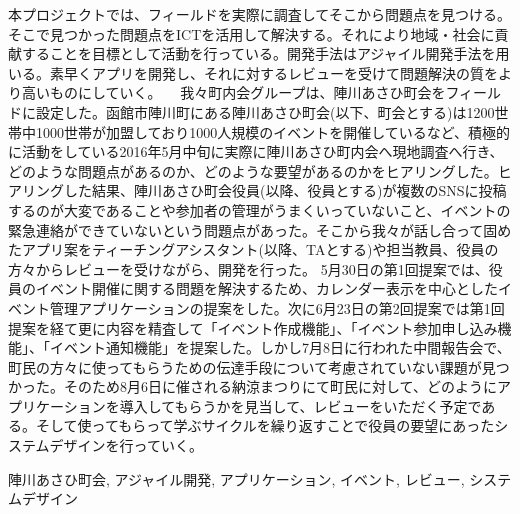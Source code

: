 \begin{jabstract}
本プロジェクトでは、フィールドを実際に調査してそこから問題点を見つける。そこで見つかった問題点をICTを活用して解決する。それにより地域・社会に貢献することを目標として活動を行っている。開発手法はアジャイル開発手法を用いる。素早くアプリを開発し、それに対するレビューを受けて問題解決の質をより高いものにしていく。
　我々町内会グループは、陣川あさひ町会をフィールドに設定した。函館市陣川町にある陣川あさひ町会(以下、町会とする)は1200世帯中1000世帯が加盟しており1000人規模のイベントを開催しているなど、積極的に活動をしている2016年5月中旬に実際に陣川あさひ町内会へ現地調査へ行き、どのような問題点があるのか、どのような要望があるのかをヒアリングした。ヒアリングした結果、陣川あさひ町会役員(以降、役員とする)が複数のSNSに投稿するのが大変であることや参加者の管理がうまくいっていないこと、イベントの緊急連絡ができていないという問題点があった。そこから我々が話し合って固めたアプリ案をティーチングアシスタント(以降、TAとする)や担当教員、役員の方々からレビューを受けながら、開発を行った。
5月30日の第1回提案では、役員のイベント開催に関する問題を解決するため、カレンダー表示を中心としたイベント管理アプリケーションの提案をした。次に6月23日の第2回提案では第1回提案を経て更に内容を精査して「イベント作成機能」、「イベント参加申し込み機能」、「イベント通知機能」を提案した。しかし7月8日に行われた中間報告会で、
町民の方々に使ってもらうための伝達手段について考慮されていない課題が見つかった。そのため8月6日に催される納涼まつりにて町民に対して、どのようにアプリケーションを導入してもらうかを見当して、レビューをいただく予定である。そして使ってもらって学ぶサイクルを繰り返すことで役員の要望にあったシステムデザインを行っていく。

\begin{jkeyword}
陣川あさひ町会, アジャイル開発, アプリケーション, イベント, レビュー, システムデザイン
\end{jkeyword}
\end{jabstract}
​
